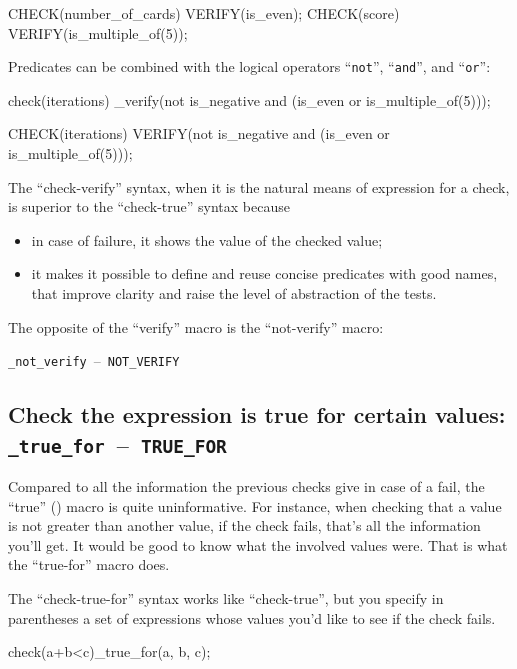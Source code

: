 \documentclass[twoside, a4paper, article]{memoir}
\newcommand*\testudocolor{\color{red!80!blue}}
\newcommand*\testudo[1]{\texttt{\testudocolor{}#1}}
\newcommand*\testudopair[2]{\testudo{#1}~--~\testudo{#2}}
\newcommand\subsectiontestudopair[3]{%
  \subsection[#1]{#1: \testudopair{#2}{#3}}}
\begin{document}
\begin{cpplisting}
CHECK(number_of_cards) VERIFY(is_even);
CHECK(score) VERIFY(is_multiple_of(5));
\end{cpplisting}

Predicates can be combined with the logical operators ``\texttt{not}'',
``\texttt{and}'', and ``\texttt{or}'':
\begin{cpplisting}
check(iterations)
  _verify(not is_negative
          and (is_even or is_multiple_of(5)));
\end{cpplisting}

\begin{cpplisting}
CHECK(iterations)
  VERIFY(not is_negative
         and (is_even or is_multiple_of(5)));
\end{cpplisting}

The ``check-verify'' syntax, when it is the natural means of expression for a
check, is superior to the ``check-true'' syntax because
\begin{itemize}
\item in case of failure, it shows the value of the checked value;
\item it makes it possible to define and reuse concise predicates with good
  names, that improve clarity and raise the level of abstraction of the tests.
\end{itemize}

The opposite of the ``verify'' macro is the ``not-verify'' macro:
\begin{center}
  \testudopair{\_not\_verify}{NOT\_VERIFY}
\end{center}

\subsectiontestudopair{Check the expression is true for certain values}%
{\_true\_for}{TRUE\_FOR}
\label{sec:check-expression-true-for}

Compared to all the information the previous checks give in case of a fail, the
``true'' () macro is quite uninformative.  For
instance, when checking that a value is not greater than another value, if the
check fails, that's all the information you'll get.  It would be good to know
what the involved values were.  That is what the ``true-for'' macro does.

The ``check-true-for'' syntax works like ``check-true'', but you specify in
parentheses a set of expressions whose values you'd like to see if the check
fails.

\begin{cpplisting}
check(a+b<c)_true_for(a, b, c);
\end{cpplisting}
\end{document}
